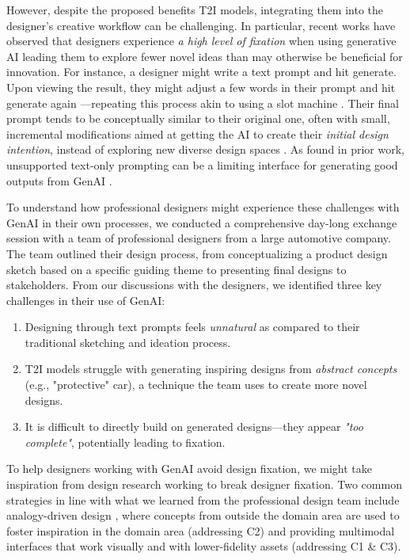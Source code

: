 \documentclass[sigconf, screen]{acmart}
\begin{document}
However, despite the proposed benefits T2I models, integrating them into the designer's creative workflow can be challenging. In particular, recent works have observed that designers experience \textit{a high level of fixation} \cite{jansson1991design} when using generative AI \cite{Wadinambiarachchi2024effects} leading them to explore fewer novel ideas than may otherwise be beneficial for innovation.
For instance, a designer might write a text prompt and hit generate. Upon viewing the result, they might adjust a few words in their prompt and hit generate again \cite{chang2023prompt}---repeating this process akin to using a slot machine \cite{ai-slot-machine}. Their final prompt tends to be conceptually similar to their original one, often with small, incremental modifications aimed at getting the AI to create their \textit{initial design intention}, instead of exploring new diverse design spaces \cite{Wadinambiarachchi2024effects}.
As found in prior work, unsupported text-only prompting can be a limiting interface for generating good outputs from GenAI \cite{zamfirescu2023johnny}.

To understand how professional designers might experience these challenges with GenAI in their own processes, we conducted a comprehensive day-long exchange session with a team of professional designers from a large automotive company.
The team outlined their design process, from conceptualizing a product design sketch based on a specific guiding theme to presenting final designs to stakeholders. 
From our discussions with the designers, we identified three key challenges in their use of GenAI:

\begin{enumerate}[label=C\arabic*]
\item Designing through text prompts feels \textit{unnatural} as compared to their traditional sketching and ideation process.
\item T2I models struggle with generating inspiring designs from \textit{abstract concepts} (e.g., "protective" car), a technique the team uses to create more novel designs.
\item It is difficult to directly build on generated designs---they appear \textit{"too complete"}, potentially leading to fixation.
\end{enumerate}

To help designers working with GenAI avoid design fixation, we might take inspiration from design research working to break designer fixation. 
Two common strategies in line with what we learned from the professional design team include analogy-driven design \cite{goel1997design,linsey2012analogy,jiang2022data}, where concepts from outside the domain area are used to foster inspiration in the domain area (addressing C2) and providing multimodal interfaces that work visually and with lower-fidelity assets (addressing C1 \& C3).
\end{document}
